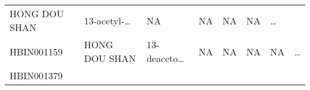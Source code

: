 \documentclass[
]{article}
\begin{document}
\begin{longtable}[]{@{}llllllll@{}}
\begin{minipage}[t]{0.11\columnwidth}
HONG DOU SHAN\strut
\end{minipage} & \begin{minipage}[t]{0.14\columnwidth}\raggedright
13-acetyl-\ldots{}\strut
\end{minipage} & \begin{minipage}[t]{0.14\columnwidth}\raggedright
NA\strut
\end{minipage} & \begin{minipage}[t]{0.08\columnwidth}\raggedright
NA\strut
\end{minipage} & \begin{minipage}[t]{0.09\columnwidth}\raggedright
NA\strut
\end{minipage} & \begin{minipage}[t]{0.11\columnwidth}\raggedright
NA\strut
\end{minipage} & \begin{minipage}[t]{0.03\columnwidth}\raggedright
\ldots{}\strut
\end{minipage}\tabularnewline
\begin{minipage}[t]{0.11\columnwidth}\raggedright
HBIN001159\strut
\end{minipage} & \begin{minipage}[t]{0.11\columnwidth}\raggedright
HONG DOU SHAN\strut
\end{minipage} & \begin{minipage}[t]{0.14\columnwidth}\raggedright
13-deaceto\ldots{}\strut
\end{minipage} & \begin{minipage}[t]{0.14\columnwidth}\raggedright
NA\strut
\end{minipage} & \begin{minipage}[t]{0.08\columnwidth}\raggedright
NA\strut
\end{minipage} & \begin{minipage}[t]{0.09\columnwidth}\raggedright
NA\strut
\end{minipage} & \begin{minipage}[t]{0.11\columnwidth}\raggedright
NA\strut
\end{minipage} & \begin{minipage}[t]{0.03\columnwidth}\raggedright
\ldots{}\strut
\end{minipage}\tabularnewline
\begin{minipage}[t]{0.11\columnwidth}\raggedright
HBIN001379\strut
\end{minipage} & \begin{minipage}[t]{0.11\columnwidth}\raggedright

\end{minipage}
\end{longtable}
\end{document}
